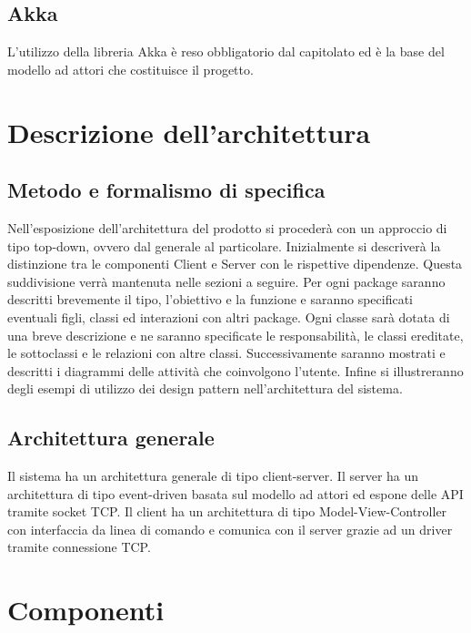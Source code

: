 \documentclass[a4paper]{article}
\begin{document}
	\subsection{Akka}
		L'utilizzo della libreria Akka è reso obbligatorio dal capitolato ed è la base del modello ad attori che costituisce il progetto.
	
	\newpage 
	\section{Descrizione dell'architettura}
		\subsection{Metodo e formalismo di specifica}
			Nell'esposizione dell'architettura del prodotto si procederà con un approccio di tipo top-down, ovvero dal generale al particolare.
			Inizialmente si descriverà la distinzione tra le componenti Client e Server con le rispettive dipendenze. Questa suddivisione verrà mantenuta nelle sezioni a seguire.
			Per ogni package saranno descritti brevemente il tipo, l'obiettivo e la funzione e saranno specificati eventuali figli, classi ed interazioni con altri package.
			Ogni classe sarà dotata di una breve descrizione e ne saranno specificate le responsabilità, le classi ereditate, le sottoclassi e le relazioni con altre classi.
			Successivamente saranno mostrati e descritti i diagrammi delle attività che coinvolgono l'utente.
			Infine si illustreranno degli esempi di utilizzo dei design pattern nell'architettura del sistema.
		\subsection{Architettura generale}
        	Il sistema ha un architettura generale di tipo client-server.
            Il server ha un architettura di tipo event-driven basata sul modello ad attori ed espone delle API tramite socket TCP.
            Il client ha un architettura di tipo Model-View-Controller con interfaccia da linea di comando e comunica con il server  grazie ad un driver tramite connessione TCP.
            
	\newpage 
	\section{Componenti}
\end{document}
